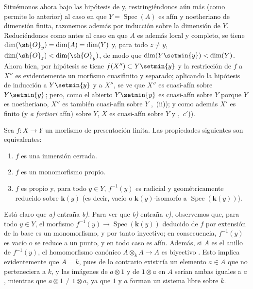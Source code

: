 Situémonos ahora bajo las hipótesis de  y, restringiéndonos aún más (como permite lo anterior) al caso en que $Y=\operatorname{Spec}(A)$ es afín y noetheriano de dimensión finita, razonemos además por inducción sobre la dimensión de $Y$.
Reduciéndonos como antes al caso en que $A$ es además local y completo, se tiene $\dim(\sh{O}_y)=\dim(A)=\dim(Y)$ y, para todo $z\neq y$, $\dim(\sh{O}_z)<\dim(\sh{O}_y)$, de modo que $\dim(Y\setmin\{y\})<\dim(Y)$.
Ahora bien, por hipótesis se tiene $f(X'')\subset Y\setmin\{y\}$ y la restricción de $f$ a $X''$ es evidentemente un morfismo cuasifinito y separado; aplicando la hipótesis de inducción a $Y\setmin\{y\}$ y a $X''$, se ve que $X''$ es cuasi-afín sobre $Y\setmin\{y\}$; pero, como el abierto $Y\setmin\{y\}$ es cuasi-afín sobre $Y$ porque $Y$ es noetheriano, $X''$ es también cuasi-afín sobre $Y$ ,~(ii)); y como además $X'$ es finito (y \emph{a fortiori} afín) sobre $Y$, $X$ es cuasi-afín sobre $Y$  y ,~$c'$)).

\begin{proposition}[8.11.5]
\label{IV.8.11.5}
Sea $f:X\to Y$ un morfismo de presentación finita.
Las propiedades siguientes son equivalentes:
\begin{enumerate}[label=\emph{\alph*)}]
  \item $f$ es una inmersión cerrada.
  \item $f$ es un monomorfismo propio.
  \item $f$ es propio y, para todo $y\in Y$, $f^{-1}(y)$ es radicial y geométricamente reducido sobre $\boldsymbol k(y)$ (es decir, vacío o $\boldsymbol k(y)$-isomorfo a $\operatorname{Spec}(\boldsymbol k(y))$).
\end{enumerate}
\end{proposition}

Está claro que \emph{a)} entraña \emph{b)}.
Para ver que \emph{b)} entraña \emph{c)}, observemos  que, para todo $y\in Y$, el morfismo $f^{-1}(y)\to\operatorname{Spec}(\boldsymbol k(y))$ deducido de $f$ por extensión de la base es un monomorfismo, y por tanto inyectivo; en consecuencia, $f^{-1}(y)$ es vacío o se reduce a un punto, y en todo caso es afín.
Además, si $A$ es el anillo de $f^{-1}(y)$, el homomorfismo canónico $A\otimes_k A\to A$ es biyectivo .
Esto implica evidentemente que $A=k$, pues de lo contrario existiría un elemento $a\in A$ que no perteneciera a $k$, y las imágenes de $a\otimes 1$ y de $1\otimes a$ en $A$ serían ambas iguales a $a$, mientras que $a\otimes 1\neq1\otimes a$, ya que $1$ y $a$ forman un sistema libre sobre $k$.

